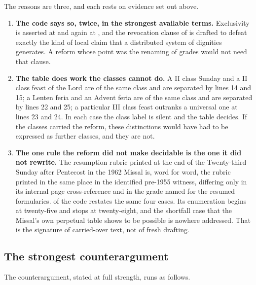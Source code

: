 The reasons are three, and each rests on evidence set out above.

\begin{enumerate}[leftmargin=1.6em, itemsep=0.3em]
\item \textbf{The code says so, twice, in the strongest available terms.} Exclusivity is
asserted at  and again at , and the revocation clause of   is drafted to defeat exactly the kind of local claim that a distributed
system of dignities generates. A reform whose point was the renaming of grades would not need
that clause.
\item \textbf{The table does work the classes cannot do.} A II class Sunday and a II class feast
of the Lord are of the same class and are separated by lines 14 and 15; a Lenten feria and an
Advent feria are of the same class and are separated by lines 22 and 25; a particular III class
feast outranks a universal one at lines 23 and 24. In each case the class label is silent and
the table decides. If the classes carried the reform, these distinctions would have had to be
expressed as further classes, and they are not.
\item \textbf{The one rule the reform did not make decidable is the one it did not rewrite.}
The resumption rubric printed at the end of the Twenty-third Sunday after Pentecost in the 1962
Missal is, word for word, the rubric printed in the same place in the identified pre-1955
witness, differing only in its internal page cross-reference and in the grade named for the
resumed formularies.  of the code restates the same four
cases. Its enumeration begins at twenty-five and stops at twenty-eight, and the shortfall case
that the Missal's own perpetual table shows to be possible is nowhere addressed. That is the
signature of carried-over text, not of fresh drafting.
\end{enumerate}

\subsection{The strongest counterargument}

The counterargument, stated at full strength, runs as follows.

